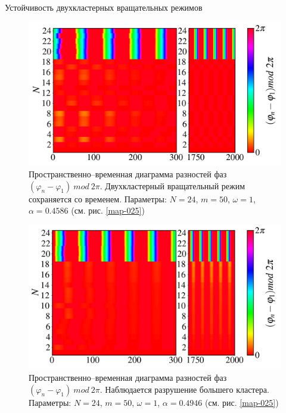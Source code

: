\begin{chapter}{Устойчивость двухкластерных вращательных режимов}
	\begin{figure}[h!]\center
		\includegraphics[width=1\columnwidth]{pictures/Figure_M_50_A_0.4586_O_1.png}
		\caption{Пространственно--временная диаграмма разностей фаз $(\varphi_n - \varphi_1) \ mod \ 2\pi$.
		Двухкластерный вращательный режим сохраняется со временем.
		Параметры: $N=24$, $m = 50$, $\omega = 1$, $\alpha = 0.4586$ (см. рис. \ref{map-025})}
		\label{st-c-1}
	\end{figure}

	\begin{figure}[h!]\center
		\includegraphics[width=1\columnwidth]{pictures/Figure_M_50_A_0.4946_O_1.png}
		\caption{Пространственно--временная диаграмма разностей фаз $(\varphi_n - \varphi_1) \ mod \ 2\pi$.
		Наблюдается разрушение большего кластера.
		Параметры: $N=24$, $m = 50$, $\omega = 1$, $\alpha = 0.4946$ (см. рис. \ref{map-025})}
		\label{st-c-2}
	\end{figure}


\end{chapter}
